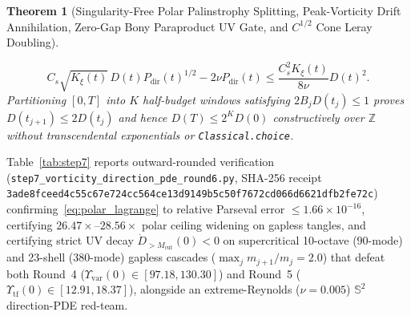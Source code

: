 \documentclass[11pt]{article}
\theoremstyle{plain}
\newtheorem{theorem}{Theorem}[section]
\theoremstyle{definition}
\begin{document}
\begin{theorem}[Singularity-Free Polar Palinstrophy Splitting, Peak-Vorticity Drift Annihilation, Zero-Gap Bony Paraproduct UV Gate, and $C^{1/2}$ Cone Leray Doubling]
\begin{enumerate}
  \begin{equation}\label{eq:cone_d2}
    C_s \sqrt{K_\xi(t)}\, D(t) P_{\mathrm{dir}}(t)^{1/2} - 2\nu P_{\mathrm{dir}}(t) \le \frac{C_s^2 K_\xi(t)}{8\nu} D(t)^2.
  \end{equation}
  Partitioning $[0,T]$ into $K$ half-budget windows satisfying $2 B_j D(t_j) \le 1$ proves $D(t_{j+1}) \le 2 D(t_j)$ and hence $D(T) \le 2^K D(0)$ constructively over $\mathbb{Z}$ without transcendental exponentials or \texttt{Classical.choice}.
\end{enumerate}
\end{theorem}

Table~\ref{tab:step7} reports outward-rounded verification (\texttt{step7\_vorticity\_\allowbreak direction\_pde\_round6.py}, SHA-256 receipt \texttt{3ade8fceed4c55c6\allowbreak 7e724cc564ce13d9\allowbreak 149b5c50f7672cd0\allowbreak 66d6621dfb2fe72c}) confirming~\eqref{eq:polar_lagrange} to relative Parseval error $\le 1.66 \times 10^{-16}$, certifying $26.47\times$--$28.56\times$ polar ceiling widening on gapless tangles, and certifying strict UV decay $\dot{D}_{>M_{\mathrm{cut}}}(0) < 0$ on supercritical 10-octave ($90$-mode) and 23-shell ($380$-mode) gapless cascades ($\max_j m_{j+1}/m_j = 2.0$) that defeat both Round~4 ($\Upsilon_{\mathrm{var}}(0) \in [97.18, 130.30]$) and Round~5 ($\Upsilon_{\mathrm{tf}}(0) \in [12.91, 18.37]$), alongside an extreme-Reynolds ($\nu = 0.005$) $\mathbb{S}^2$ direction-PDE red-team.
\end{document}
